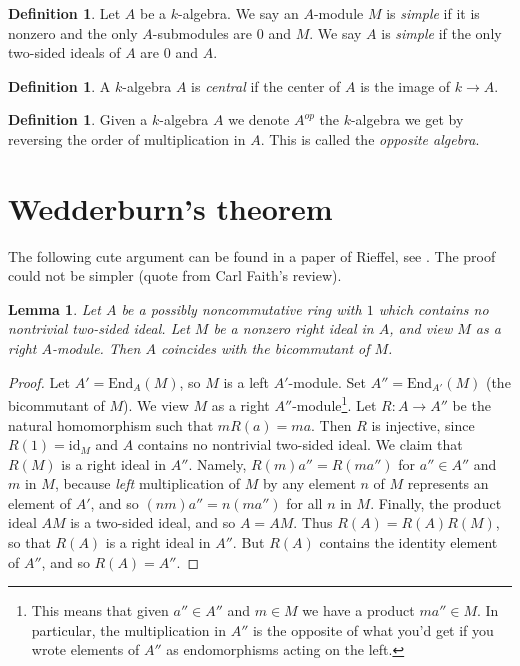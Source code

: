 \documentclass{stacks-project}
\theoremstyle{plain}
\newtheorem{lemma}[subsection]{Lemma}
\theoremstyle{definition}
\newtheorem{definition}[subsection]{Definition}
\theoremstyle{remark}
\numberwithin{equation}{subsection}
\begin{document}
\begin{definition}
\label{definition-simple}
Let $A$ be a $k$-algebra.
We say an $A$-module $M$ is {\it simple} if it is nonzero and
the only $A$-submodules are $0$ and $M$.
We say $A$ is {\it simple} if the only two-sided ideals of $A$ are
$0$ and $A$.
\end{definition}

\begin{definition}
\label{definition-central}
A $k$-algebra $A$ is {\it central} if the center of $A$ is the image of
$k \to A$.
\end{definition}

\begin{definition}
\label{definition-opposite}
Given a $k$-algebra $A$ we denote $A^{op}$ the $k$-algebra we get by
reversing the order of multiplication in $A$. This is called the
{\it opposite algebra}.
\end{definition}




\section{Wedderburn's theorem}
\label{section-wedderburn}

\noindent
The following cute argument can be found in a paper of Rieffel, see
\cite{Rieffel}. The proof could not be simpler (quote from
Carl Faith's review).

\begin{lemma}
\label{lemma-rieffel}
Let $A$ be a possibly noncommutative ring with $1$ which contains no
nontrivial two-sided ideal. Let $M$ be a nonzero right ideal in $A$,
and view $M$ as a right $A$-module. Then $A$ coincides with the
bicommutant of $M$.
\end{lemma}

\begin{proof}
Let $A' = \text{End}_A(M)$, so $M$ is a left $A'$-module.
Set $A'' = \text{End}_{A'}(M)$ (the bicommutant of $M$).
We view $M$ as a right $A''$-module\footnote{This
means that given $a'' \in A''$ and $m \in M$ we have a product
$m a'' \in M$. In particular, the multiplication in $A''$
is the opposite of what you'd get if you wrote elements of $A''$
as endomorphisms acting on the left.}.
Let $R : A \to A''$ be the natural homomorphism such that
$mR(a) = ma$. Then $R$ is injective, since $R(1) = \text{id}_M$
and $A$ contains no nontrivial two-sided ideal. We claim that $R(M)$
is a right ideal in $A''$. Namely, $R(m)a'' = R(ma'')$ for $a'' \in A''$
and $m$ in $M$, because {\it left} multiplication of $M$ by any element $n$
of $M$ represents an element of $A'$, and so
$(nm)a'' = n(ma'')$ for all $n$ in $M$.
Finally, the product ideal $AM$ is a two-sided ideal, and so
$A = AM$. Thus $R(A) = R(A)R(M)$, so that $R(A)$ is a right ideal in $A''$.
But $R(A)$ contains the identity element of $A''$, and so $R(A) = A''$.
\end{proof}
\end{document}
